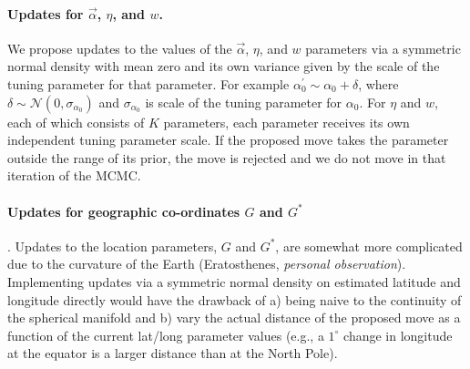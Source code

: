 \documentclass[12pt]{article}
\newcommand{\identifyadmixsource}[1]{{#1^{*}}}
\begin{document}



\paragraph{Updates for $\vec{\alpha}$, $\eta$, and $w$.}
We propose updates to the values of the $\vec{\alpha}$, $\eta$, and $w$ parameters via a symmetric normal density with mean zero and its own variance given by the scale of the tuning parameter for that parameter.  For example $\alpha_0^{\prime} \sim \alpha_0 + \delta$, where $\delta \sim \mathcal{N}(0,\sigma_{\alpha_0})$ and $\sigma_{\alpha_0}$ is scale of the tuning parameter for $\alpha_0$.  For $\eta$ and $w$, each of which consists of $K$ parameters, each parameter receives its own independent tuning parameter scale. If the proposed move takes the parameter outside the range of its prior, the move is rejected and we do not move in that iteration of the MCMC.



\paragraph{Updates for geographic co-ordinates $G$ and $\identifyadmixsource{G}$}. Updates to the location parameters, $G$ and $\identifyadmixsource{G}$, are somewhat more complicated due to the curvature of the Earth (Eratosthenes, \textit{personal observation}).  Implementing updates via a symmetric normal density on estimated latitude and longitude directly would have the drawback of a) being naive to the continuity of the spherical manifold and b) vary the actual distance of the proposed move as a function of the current lat/long parameter values (e.g., a $1^{\circ}$ change in longitude at the equator is a larger distance than at the North Pole).  
\end{document}
